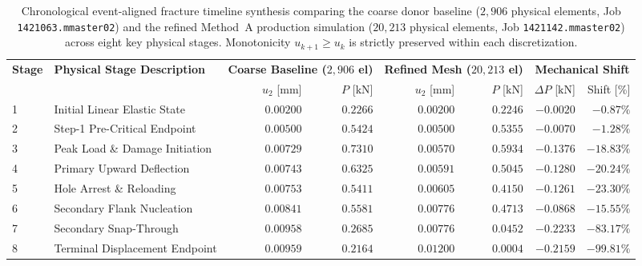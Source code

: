 \begin{table}[htbp]
\centering
\small
\caption{Chronological event-aligned fracture timeline synthesis comparing the coarse donor baseline ($2{,}906$ physical elements, Job \texttt{1421063.mmaster02}) and the refined Method~A production simulation ($20{,}213$ physical elements, Job \texttt{1421142.mmaster02}) across eight key physical stages. Monotonicity $u_{k+1} \ge u_k$ is strictly preserved within each discretization.}
\label{tab:fracture_timeline_comparison}
\begin{tabularx}{\textwidth}{lp{2.4cm}rrrrrr}
\hline
\textbf{Stage} & \textbf{Physical Stage Description} & \multicolumn{2}{c}{\textbf{Coarse Baseline ($2{,}906$ el)}} & \multicolumn{2}{c}{\textbf{Refined Mesh ($20{,}213$ el)}} & \multicolumn{2}{c}{\textbf{Mechanical Shift}} \\
 & & $u_2$ [$\mathrm{mm}$] & $P$ [$\mathrm{kN}$] & $u_2$ [$\mathrm{mm}$] & $P$ [$\mathrm{kN}$] & $\Delta P$ [$\mathrm{kN}$] & Shift [\%] \\
\hline
1 & Initial Linear Elastic State & $0.00200$ & $0.2266$ & $0.00200$ & $0.2246$ & $-0.0020$ & $-0.87\%$ \\
2 & Step-1 Pre-Critical Endpoint & $0.00500$ & $0.5424$ & $0.00500$ & $0.5355$ & $-0.0070$ & $-1.28\%$ \\
3 & Peak Load \& Damage Initiation & $0.00729$ & $0.7310$ & $0.00570$ & $0.5934$ & $-0.1376$ & $-18.83\%$ \\
4 & Primary Upward Deflection & $0.00743$ & $0.6325$ & $0.00591$ & $0.5045$ & $-0.1280$ & $-20.24\%$ \\
5 & Hole Arrest \& Reloading & $0.00753$ & $0.5411$ & $0.00605$ & $0.4150$ & $-0.1261$ & $-23.30\%$ \\
6 & Secondary Flank Nucleation & $0.00841$ & $0.5581$ & $0.00776$ & $0.4713$ & $-0.0868$ & $-15.55\%$ \\
7 & Secondary Snap-Through & $0.00958$ & $0.2685$ & $0.00776$ & $0.0452$ & $-0.2233$ & $-83.17\%$ \\
8 & Terminal Displacement Endpoint & $0.00959$ & $0.2164$ & $0.01200$ & $0.0004$ & $-0.2159$ & $-99.81\%$ \\
\hline
\end{tabularx}
\end{table}

